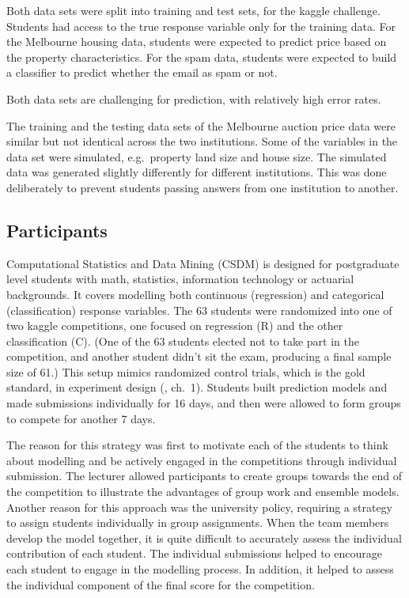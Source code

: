 \documentclass[12pt]{article}
\begin{document}
Both data sets were split into training and test sets, for the kaggle
challenge. Students had access to the true response variable only for
the training data. For the Melbourne housing data, students were
expected to predict price based on the property characteristics. For the
spam data, students were expected to build a classifier to predict
whether the email as spam or not.

Both data sets are challenging for prediction, with relatively high
error rates.

The training and the testing data sets of the Melbourne auction price
data were similar but not identical across the two institutions. Some of
the variables in the data set were simulated, e.g.~property land size
and house size. The simulated data was generated slightly differently
for different institutions. This was done deliberately to prevent
students passing answers from one institution to another.

\subsection{Participants}\label{participants}

Computational Statistics and Data Mining (CSDM) is designed for
postgraduate level students with math, statistics, information
technology or actuarial backgrounds. It covers modelling both continuous
(regression) and categorical (classification) response variables. The 63
students were randomized into one of two kaggle competitions, one
focused on regression (R) and the other classification (C). (One of the
63 students elected not to take part in the competition, and another
student didn't sit the exam, producing a final sample size of 61.) This
setup mimics randomized control trials, which is the gold standard, in
experiment design (\citet{Shelley09CH1}, ch.~1). Students built
prediction models and made submissions individually for 16 days, and
then were allowed to form groups to compete for another 7 days.

The reason for this strategy was first to motivate each of the students
to think about modelling and be actively engaged in the competitions
through individual submission. The lecturer allowed participants to
create groups towards the end of the competition to illustrate the
advantages of group work and ensemble models. Another reason for this
approach was the university policy, requiring a strategy to assign
students individually in group assignments. When the team members
develop the model together, it is quite difficult to accurately assess
the individual contribution of each student. The individual submissions
helped to encourage each student to engage in the modelling process. In
addition, it helped to assess the individual component of the final
score for the competition.
\end{document}
